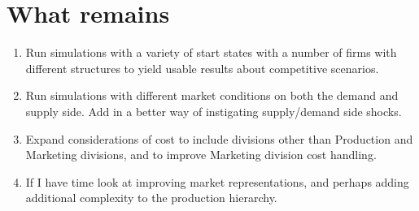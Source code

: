 \documentclass[11pt]{article}
\begin{document}
\section{What remains}
\begin{enumerate}
	\item Run simulations with a variety of start states with a number of firms with different structures to yield usable results about competitive scenarios.
	\item Run simulations with different market conditions on both the demand and supply side. Add in a better way of instigating supply/demand side shocks.
	\item Expand considerations of cost to include divisions other than Production and Marketing divisions, and to improve Marketing division cost handling.
	\item If I have time look at improving market representations, and perhaps adding additional complexity to the production hierarchy.
\end{enumerate}
\end{document}
